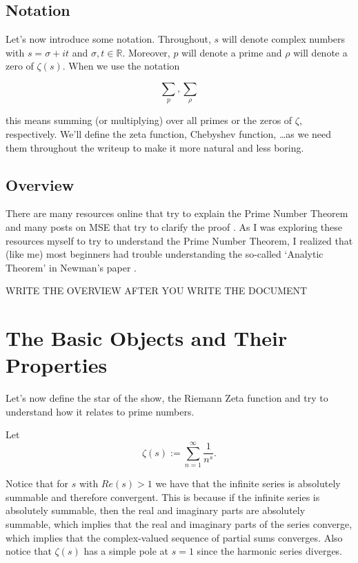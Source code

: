 \documentclass{article}
\theoremstyle{definition}
\begin{document}
\subsection{Notation}

Let's now introduce some notation. Throughout, $ s $ will denote complex numbers with $ s = \sigma + it $ and $ \sigma, t \in \mathbb{R} $.
Moreover, $ p $ will denote a prime and $ \rho $ will denote a zero of $ \zeta(s) $.
When we use the notation 

\[ \sum_{p}, \sum_{\rho}\]

this means summing (or multiplying) over all primes or the zeros of $ \zeta $, respectively. We'll define the zeta function,
Chebyshev function, \ldots as we need them throughout the writeup to make it more natural and less boring.

\subsection{Overview}

There are many resources online that try to explain the Prime Number Theorem and many posts
on MSE that try to clarify the proof \cite{bandeira_complex_nodate} \cite{avi_why_2015} \cite{coffee_table_what_2018}. 
As I was exploring these resources myself to try to
understand the Prime Number Theorem, I realized that (like me) most beginners
had trouble understanding the so-called `Analytic Theorem' in Newman's paper . 

WRITE THE OVERVIEW AFTER YOU WRITE THE DOCUMENT

\newpage

\section{The Basic Objects and Their Properties}

Let's now define the star of the show, the Riemann Zeta function and
try to understand how it relates to prime numbers.

Let \[ \zeta(s) := \sum_{n = 1}^{\infty} \frac{1}{n^{s}} .\] 

Notice that for $ s $ with $ Re(s) > 1 $ we have that the infinite series is absolutely
summable and therefore convergent. This is because if the infinite series is absolutely
summable, then the real and imaginary parts are absolutely summable, which implies that
the real and imaginary parts of the series converge, which implies that the complex-valued
sequence of partial sums converges. Also notice that $ \zeta(s) $ has a simple pole
at $ s = 1 $ since the harmonic series diverges. 
\end{document}
